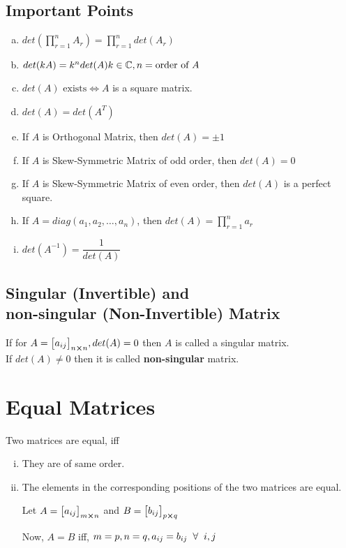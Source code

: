 \documentclass{article}
\begin{document}
\subsection*{Important Points}
\begin{enumerate}[a.]
    \item $det\left(\displaystyle\prod_{r=1}^{n} A_{r}\right)=\displaystyle\prod_{r=1}^{n} det(A_{r}) $
    \item $det(kA)=k^n det(A) \hfill k \in \mathbb{C}, n = \text{order of $A$} $
    \item $det(A) \text{ exists} \iff A$ is a square matrix.
    \item $det(A)=det(A^T) $
    \item If $A$ is Orthogonal Matrix, then $det(A)=\pm 1 $
    \item If $A$ is Skew-Symmetric Matrix of odd order, then $det(A)=0$
    \item If $A$ is Skew-Symmetric Matrix of even order, then $det(A)$ is a perfect square.
    \item If $A=diag(a_{1}, a_{2}, \ldots , a_{n})$, then $det(A)=\displaystyle\prod_{r=1}^{n}a_{r}$
    \item $det(A^{-1})=\dfrac{1}{det(A)}$
\end{enumerate}

\subsection*{Singular (Invertible) and\\ non-singular (Non-Invertible) Matrix}

If for $A={\begin{bmatrix}
        a_{ij}
    \end{bmatrix}}_{n \cross n}, det(A)=0 $ then $A$ is called a \textbf{}{singular} matrix. \\If $det(A) \not= 0$ then it is called \textbf{non-singular} matrix.

\section{Equal Matrices}
Two matrices are equal, iff
\begin{enumerate}[i.]
    \item They are of same order.
    \item The elements in the corresponding positions of the two matrices are equal.

          Let $A={\begin{bmatrix}
                  a_{ij}
              \end{bmatrix}}_{m \cross n} $ and $B={\begin{bmatrix}
                  b_{ij}
              \end{bmatrix}}_{p \cross q} $

          Now, $A=B$ iff, $m=p, n=q, a_{ij}=b_{ij} \hspace{2mm} \forall \hspace{2mm} i,j$
\end{enumerate}
\end{document}
